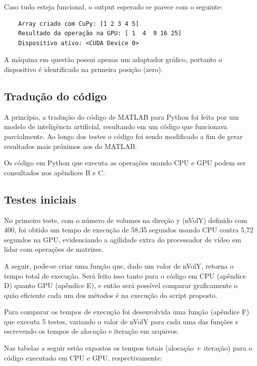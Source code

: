 \documentclass[
    12pt,
    openright,
    oneside,
    a4paper,
    english,
    brazil,
]{abntex2}
\begin{document}
Caso tudo esteja funcional, o output esperado se parece com o seguinte:

\begin{verbatim}
    Array criado com CuPy: [1 2 3 4 5]
    Resultado da operação na GPU: [ 1  4  9 16 25]
    Dispositivo ativo: <CUDA Device 0>
\end{verbatim}

A máquina em questão possui apenas um adaptador gráfico, portanto o dispositivo é identificado na primeira posição (zero).


\subsection{Tradução do código}

A princípio, a tradução do código de MATLAB para Python foi feita por um modelo de inteligência artificial, resultando em um código que funcionava parcialmente. Ao longo dos testes o código foi sendo modificado a fim de gerar resultados mais próximos aos do MATLAB.

Os código em Python que executa as operações usando CPU e GPU podem ser consultados nos apêndices B e C.

\subsection{Testes iniciais}

No primeiro teste, com o número de volumes na direção y (nVolY) definido com 400, foi obtido um tempo de execução de 58,35 segundos usando CPU contra 5,72 segundos na GPU, evidenciando a agilidade extra do processador de vídeo em lidar com operações de matrizes.

A seguir, pode-se criar uma função que, dado um valor de nVolY, retorna o tempo total de execução. Será feito isso tanto para o código em CPU (apêndice D) quanto GPU (apêndice E), e então será possível comparar graficamente o quão eficiente cada um dos métodos é na execução do script proposto.

Para comparar os tempos de execução foi desenvolvida uma função (apêndice F) que executa 5 testes, variando o valor de nVolY para cada uma das funções e escrevendo os tempos de alocação e iteração em arquivos.

Nas tabelas a seguir estão expostos os tempos totais (alocação + iteração) para o código executado em CPU e GPU, respectivamente:
\end{document}
